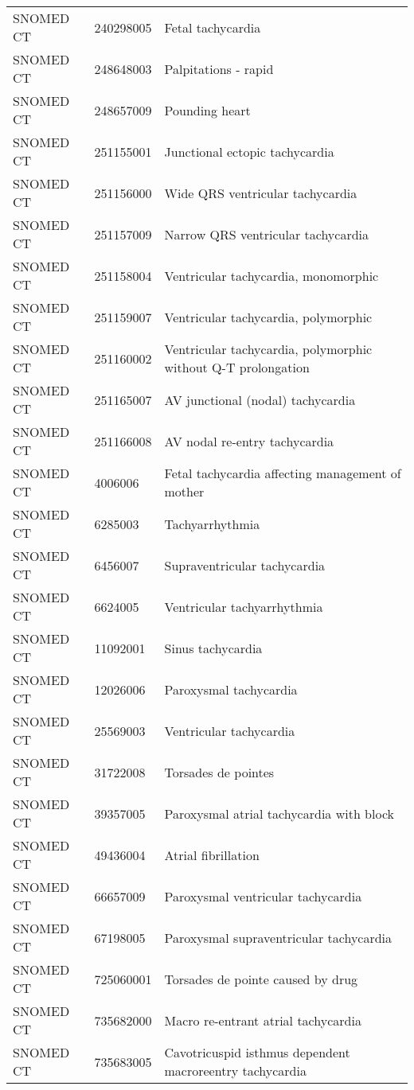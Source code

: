 \begin{longtable}{p{}p{}p{}}
  SNOMED CT & 240298005 & Fetal tachycardia \\ 
  SNOMED CT & 248648003 & Palpitations - rapid \\ 
  SNOMED CT & 248657009 & Pounding heart \\ 
  SNOMED CT & 251155001 & Junctional ectopic tachycardia \\ 
  SNOMED CT & 251156000 & Wide QRS ventricular tachycardia \\ 
  SNOMED CT & 251157009 & Narrow QRS ventricular tachycardia \\ 
  SNOMED CT & 251158004 & Ventricular tachycardia, monomorphic \\ 
  SNOMED CT & 251159007 & Ventricular tachycardia, polymorphic \\ 
  SNOMED CT & 251160002 & Ventricular tachycardia, polymorphic without Q-T prolongation \\ 
  SNOMED CT & 251165007 & AV junctional (nodal) tachycardia \\ 
  SNOMED CT & 251166008 & AV nodal re-entry tachycardia \\ 
  SNOMED CT & 4006006 & Fetal tachycardia affecting management of mother \\ 
  SNOMED CT & 6285003 & Tachyarrhythmia \\ 
  SNOMED CT & 6456007 & Supraventricular tachycardia \\ 
  SNOMED CT & 6624005 & Ventricular tachyarrhythmia \\ 
  SNOMED CT & 11092001 & Sinus tachycardia \\ 
  SNOMED CT & 12026006 & Paroxysmal tachycardia \\ 
  SNOMED CT & 25569003 & Ventricular tachycardia \\ 
  SNOMED CT & 31722008 & Torsades de pointes \\ 
  SNOMED CT & 39357005 & Paroxysmal atrial tachycardia with block \\ 
  SNOMED CT & 49436004 & Atrial fibrillation \\ 
  SNOMED CT & 66657009 & Paroxysmal ventricular tachycardia \\ 
  SNOMED CT & 67198005 & Paroxysmal supraventricular tachycardia \\ 
  SNOMED CT & 725060001 & Torsades de pointe caused by drug \\ 
  SNOMED CT & 735682000 & Macro re-entrant atrial tachycardia \\ 
  SNOMED CT & 735683005 & Cavotricuspid isthmus dependent macroreentry tachycardia \\ 

\end{longtable}
